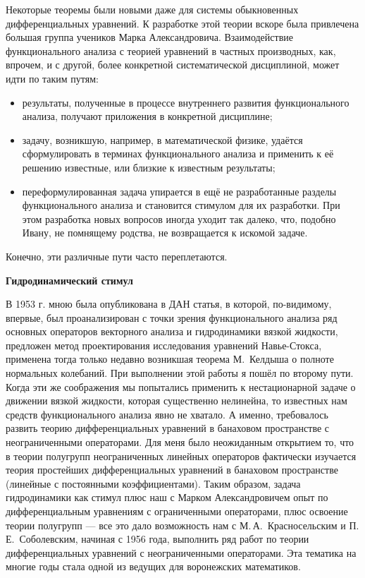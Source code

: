 Некоторые теоремы были новыми даже для системы
\linebreak
обы\-к\-но\-вен\-ных дифференциальных уравнений.
К разработке этой теории вскоре была привлечена большая группа учеников Марка Александровича. Взаимодействие функционального анализа с теорией уравнений в частных производных, как, впрочем, и с другой, более конкретной систематической дисциплиной, может идти по таким путям:
\begin{itemize}
	\item
		результаты,   полученные   в процессе внутреннего развития функционального анализа, получают приложения в конкретной дисциплине;
	\item
		задачу, возникшую, например, в математической физике, удаётся
	 сформулировать в терминах функционального анализа и применить к её решению известные, или близкие к известным результаты;
	\item
		переформулированная задача упирается в ещё не разработанные разделы функционального анализа и становится стимулом для их разработки. При этом разработка новых вопросов иногда уходит так далеко, что, подобно Ивану, не помнящему родства, не возвращается к искомой задаче.
\end{itemize}
Конечно, эти различные пути часто переплетаются.

{\bf Гидродинамический стимул}

В 1953 г. мною была опубликована в ДАН статья, в которой, по-видимому, впервые, был проанализирован с точки зрения функционального анализа ряд основных операторов векторного анализа и гидродинамики вязкой жидкости, предложен метод проектирования исследования уравнений Навье-Стокса, применена тогда только недавно возникшая теорема М.~Келдыша о полноте нормальных колебаний. При выполнении этой работы я пошёл по второму пути. Когда эти же соображения мы попытались применить к нестационарной задаче о движении вязкой жидкости, которая существенно нелинейна, то известных нам средств функционального анализа явно не хватало. А именно, требовалось развить теорию дифференциальных уравнений в банаховом пространстве с неограниченными операторами. Для меня было неожиданным открытием то, что в теории полугрупп неограниченных линейных операторов фактически изучается теория простейших дифференциальных уравнений в банаховом пространстве (линейные с постоянными коэффициентами). Таким образом, задача гидродинамики как стимул плюс наш с Марком Александровичем опыт по дифференциальным уравнениям с ограниченными операторами, плюс освоение теории полугрупп — все это дало возможность нам с М.\,А.~Красносельским и П.\,Е.~Соболевским, начиная с 1956 года, выполнить ряд работ по теории дифференциальных уравнений с неограниченными операторами. Эта тематика на многие годы стала одной из ведущих для воронежских математиков.

